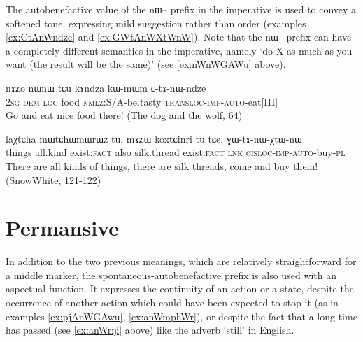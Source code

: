 \documentclass[oldfontcommands,oneside,a4paper,11pt]{article}
\newcommand{\ipa}[1]{{\phon \mbox{#1}}} %
\begin{document}
The autobenefactive value of the \ipa{nɯ--} prefix in the imperative is used to convey a softened tone, expressing mild suggestion rather than order (examples \ref{ex:CtAnWndze} and \ref{ex:GWtAnWXtWnW}). Note that the \ipa{nɯ--} prefix can have a completely different semantics in the imperative, namely `do X as much as you want (the result will be the same)' (see  \ref{ex:nWnWGAWu} above).

\begin{exe}
\ex \label{ex:CtAnWndze}
\gll
\ipa{nɤʑo} 	\ipa{nɯnɯ} \ipa{tɕu} 	\ipa{kɤndza} 	\ipa{kɯ-mɯm} 	\ipa{ɕ-tɤ-nɯ-ndze} \\
\textsc{2sg} \textsc{dem} \textsc{loc} food \textsc{nmlz}:S/A-be.tasty \textsc{transloc-imp-auto}-eat[III] \\
\glt Go and eat nice food there! (The dog and the wolf, 64)
\end{exe}

\begin{exe}
\ex \label{ex:GWtAnWXtWnW}
\gll
\ipa{laχtɕha} 	\ipa{mɯtɕhɯmɯrɯz} 	\ipa{tu,} 	\ipa{mɤʑɯ} 	\ipa{koxtɕinri} 	\ipa{tu} 	\ipa{tɕe,} 	\ipa{ɣɯ-tɤ-nɯ-χtɯ-nɯ} \\ 
things all.kind exist:\textsc{fact} also silk.thread exist:\textsc{fact} \textsc{lnk} \textsc{cisloc-imp-auto}-buy-\textsc{pl} \\
\glt There are all kinds of things, there are silk threads, come and buy them! (SnowWhite, 121-122)
\end{exe}



\section{Permansive}
In addition to the two previous meanings, which are relatively straightforward for a middle marker, the spontaneous-autobenefactive prefix is also used with an aspectual function. It expresses the continuity of an action or a state, despite the occurrence of another action which could have been expected to stop it (as in examples \ref{ex:pjAnWGAwu}, \ref{ex:anWmphWr}), or despite the fact that a long time has passed (see \ref{ex:anWrŋi} above) like the adverb `still' in English. 
\end{document}
